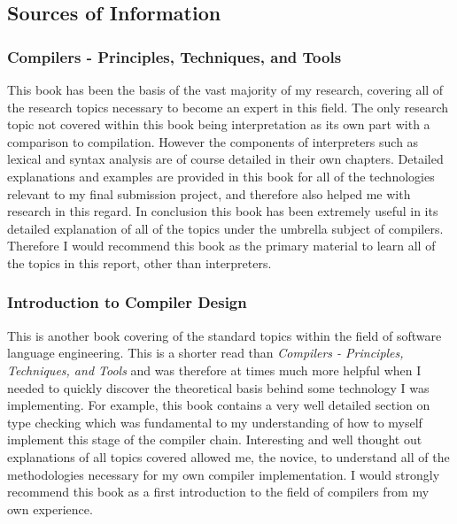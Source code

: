 \documentclass[a4paper, 11pt]{article}
\begin{document}
\subsection{Sources of Information}
\subsubsection{Compilers - Principles, Techniques, and Tools \cite{Dragon}}
This book has been the basis of the vast majority of my research, covering all of the research topics necessary to become an expert in this field. The only research topic not covered within this book being interpretation as its own part with a comparison to compilation. However the components of interpreters such as lexical and syntax analysis are of course detailed in their own chapters. Detailed explanations and examples are provided in this book for all of the technologies relevant to my final submission project, and therefore also helped me with research in this regard. In conclusion this book has been extremely useful in its detailed explanation of all of the topics under the umbrella subject of compilers. Therefore I would recommend this book as the primary material to learn all of the topics in this report, other than interpreters.

\subsubsection{Introduction to Compiler Design \cite{ItCD}}
This is another book covering of the standard topics within the field of software language engineering. This is a shorter read than \textit{Compilers - Principles, Techniques, and Tools} and was therefore at times much more helpful when I needed to quickly discover the theoretical basis behind some technology I was implementing. For example, this book contains a very well detailed section on type checking which was fundamental to my understanding of how to myself implement this stage of the compiler chain. Interesting and well thought out explanations of all topics covered allowed me, the novice, to understand all of the methodologies necessary for my own compiler implementation. I would strongly recommend this book as a first introduction to the field of compilers from my own experience.
\end{document}
